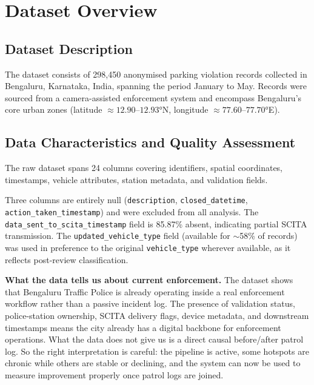 \documentclass[12pt,a4paper]{article}
\begin{document}
\section{Dataset Overview}

\subsection{Dataset Description}

The dataset consists of 298,450 anonymised parking violation records collected in Bengaluru,
Karnataka, India, spanning the period January to May. Records were sourced from a
camera-assisted enforcement system and encompass Bengaluru's core urban zones (latitude
$\approx 12.90$--$12.93$°N, longitude $\approx 77.60$--$77.70$°E).

\subsection{Data Characteristics and Quality Assessment}

The raw dataset spans 24 columns covering identifiers, spatial coordinates, timestamps, vehicle attributes, station metadata, and validation fields.

Three columns are entirely null (\texttt{description}, \texttt{closed\_datetime},
\texttt{action\_taken\_timestamp}) and were excluded from all analysis. The
\texttt{data\_sent\_to\_scita\_timestamp} field is 85.87\% absent, indicating partial SCITA
transmission. The \texttt{updated\_vehicle\_type} field (available for $\sim$58\% of records)
was used in preference to the original \texttt{vehicle\_type} wherever available, as it
reflects post-review classification.

\textbf{What the data tells us about current enforcement.} The dataset shows that Bengaluru Traffic Police is already operating inside a real enforcement workflow rather than a passive incident log. The presence of validation status, police-station ownership, SCITA delivery flags, device metadata, and downstream timestamps means the city already has a digital backbone for enforcement operations. What the data does not give us is a direct causal before/after patrol log. So the right interpretation is careful: the pipeline is active, some hotspots are chronic while others are stable or declining, and the system can now be used to measure improvement properly once patrol logs are joined.
\end{document}
